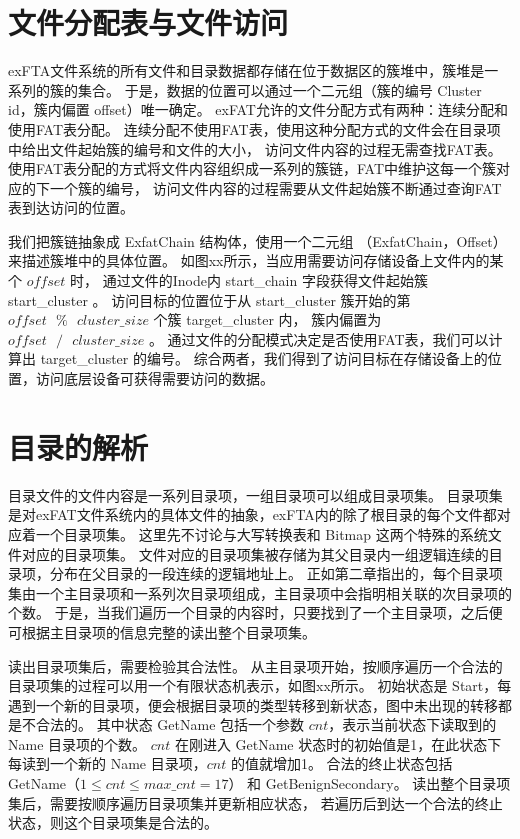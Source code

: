 \section{文件分配表与文件访问}\label{sec:FAT}
exFTA文件系统的所有文件和目录数据都存储在位于数据区的簇堆中，簇堆是一系列的簇的集合。
于是，数据的位置可以通过一个二元组（簇的编号 Cluster id，簇内偏置 offset）唯一确定。
exFAT允许的文件分配方式有两种：连续分配和使用FAT表分配。
连续分配不使用FAT表，使用这种分配方式的文件会在目录项中给出文件起始簇的编号和文件的大小，
访问文件内容的过程无需查找FAT表。
使用FAT表分配的方式将文件内容组织成一系列的簇链，FAT中维护这每一个簇对应的下一个簇的编号，
访问文件内容的过程需要从文件起始簇不断通过查询FAT表到达访问的位置。

我们把簇链抽象成 ExfatChain 结构体，使用一个二元组 （ExfatChain，Offset） 来描述簇堆中的具体位置。
如图xx所示，当应用需要访问存储设备上文件内的某个 $ offset $ 时，
通过文件的Inode内 start\_chain 字段获得文件起始簇 start\_cluster 。
访问目标的位置位于从 start\_cluster 簇开始的第 $ offset \text{ }\%\text{ } cluster\_size $ 个簇 target\_cluster 内，
簇内偏置为 $ offset \text{ }/\text{ } cluster\_size $ 。
通过文件的分配模式决定是否使用FAT表，我们可以计算出 target\_cluster 的编号。
综合两者，我们得到了访问目标在存储设备上的位置，访问底层设备可获得需要访问的数据。

\section{目录的解析}\label{sec:dentry}
目录文件的文件内容是一系列目录项，一组目录项可以组成目录项集。
目录项集是对exFAT文件系统内的具体文件的抽象，exFTA内的除了根目录的每个文件都对应着一个目录项集。
这里先不讨论与大写转换表和 Bitmap 这两个特殊的系统文件对应的目录项集。
文件对应的目录项集被存储为其父目录内一组逻辑连续的目录项，分布在父目录的一段连续的逻辑地址上。
正如第二章指出的，每个目录项集由一个主目录项和一系列次目录项组成，主目录项中会指明相关联的次目录项的个数。
于是，当我们遍历一个目录的内容时，只要找到了一个主目录项，之后便可根据主目录项的信息完整的读出整个目录项集。

读出目录项集后，需要检验其合法性。
从主目录项开始，按顺序遍历一个合法的目录项集的过程可以用一个有限状态机表示，如图xx所示。
初始状态是 Start，每遇到一个新的目录项，便会根据目录项的类型转移到新状态，图中未出现的转移都是不合法的。
其中状态 GetName 包括一个参数 $ cnt $，表示当前状态下读取到的 Name 目录项的个数。
$ cnt $ 在刚进入 GetName 状态时的初始值是1，在此状态下每读到一个新的 Name 目录项，$ cnt $ 的值就增加1。
合法的终止状态包括 GetName（$ 1 \leq cnt \leq max\_cnt = 17 $） 和 GetBenignSecondary。 
读出整个目录项集后，需要按顺序遍历目录项集并更新相应状态，
若遍历后到达一个合法的终止状态，则这个目录项集是合法的。


